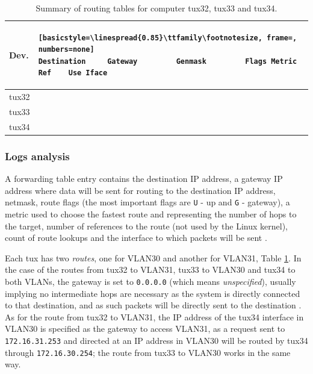 \documentclass[a4paper, 11pt]{report}
\begin{document}
\begin{table}[H]
    \small
    \begin{tabular}{l | l}
        \textbf{Dev.} & \begin{lstlisting}[basicstyle=\linespread{0.85}\ttfamily\footnotesize, frame=, numbers=none]
Destination     Gateway         Genmask         Flags Metric Ref    Use Iface
            \end{lstlisting} \\ \hline
        tux32 &  \\ \hline
        tux33 &  \\ \hline
        tux34 & 
    \end{tabular}
    \caption{Summary of routing tables for computer tux32, tux33 and tux34.}
    \label{tab:summary-routes}
\end{table}

\subsubsection{Logs analysis} \label{sec:Log3}

A forwarding table entry contains the destination IP address, a gateway IP address where data will be sent for routing to the destination IP address, netmask, route flags (the most important flags are \texttt{U} - up and \texttt{G} - gateway), a metric used to choose the fastest route and representing the number of hops to the target, number of references to the route (not used by the Linux kernel), count of route lookups and the interface to which packets will be sent \cite{man-route}.

Each tux has two \textit{routes}, one for VLAN30 and another for VLAN31, Table \ref{tab:summary-routes}.
In the case of the routes from tux32 to VLAN31, tux33 to VLAN30 and tux34 to both VLANs, the gateway is set to \texttt{0.0.0.0} (which means \textit{unspecified}), usually implying no intermediate hops are necessary as the system is directly connected to that destination, and as such packets will be directly sent to the destination \cite{routing-basics}.
As for the route from tux32 to VLAN31, the IP address of the tux34 interface in VLAN30 is specified as the gateway to access VLAN31, as a request sent to \texttt{172.16.31.253} and directed at an IP address in VLAN30 will be routed by tux34 through \texttt{172.16.30.254}; the route from tux33 to VLAN30 works in the same way. 
\end{document}
